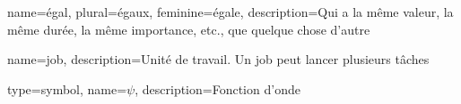


{
        name=égal,
        plural=égaux,
        feminine=égale,
        description={Qui a la même valeur, la même durée, la même importance, etc., que quelque chose d'autre}
}

{
        name=job,
        description={Unité de travail. Un job peut lancer plusieurs tâches}
}








{%
  type=symbol,
  name={\ensuremath{\psi}},
  description={Fonction d'onde}
}

